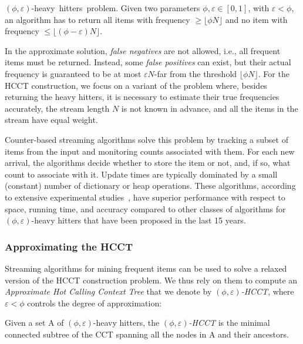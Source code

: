 \begin{definition} 
{\mbox{$(\phi,\varepsilon)$-heavy hitters problem.}} Given two parameters $\phi,\varepsilon\in[0,1]$, with $\varepsilon<\phi$, an algorithm has to return all items with frequency $\ge\lfloor\phi N\rfloor$ and no item with frequency $\le\lfloor(\phi-\varepsilon) N\rfloor$.
\end{definition} 

\noindent In the approximate solution, {\em false negatives} are not allowed, i.e., all frequent items must be returned. Instead, some {\em false positives} can exist, but their actual frequency is guaranteed to be at most $\varepsilon N$-far from the threshold $\lfloor\phi N\rfloor$. For the HCCT construction, we focus on a variant of the problem where, besides returning the heavy hitters, it is necessary to estimate their true frequencies accurately, the stream length $N$ is not known in advance, and all the items in the stream have equal weight.

Counter-based streaming algorithms solve this problem by tracking a subset of items from the input and monitoring counts associated with them. For each new arrival, the algorithms decide whether to store the item or not, and, if so, what count to associate with it. Update times are typically dominated by a small (constant) number of dictionary or heap operations. These algorithms, according to extensive experimental studies~\cite{Cormode08,Manerikar09}, have superior performance with respect to space, running time, and accuracy compared to other classes of algorithms for $(\phi,\varepsilon)$-heavy hitters
that have been proposed in the last 15 years.

\subsubsection*{Approximating the HCCT}
Streaming algorithms for mining frequent items can be used to solve a relaxed version of the HCCT construction problem. We thus rely on them to compute an {\em Approximate Hot Calling Context Tree} that we denote by {\em $(\phi,\varepsilon)$-HCCT}, where $\varepsilon<\phi$ controls the degree of approximation:

\begin{definition}
Given a set A of $(\phi,\varepsilon)$-heavy hitters, the {\em $(\phi,\varepsilon)$-HCCT} is the minimal connected subtree of the CCT spanning all the nodes in A and their ancestors.
\end{definition}

